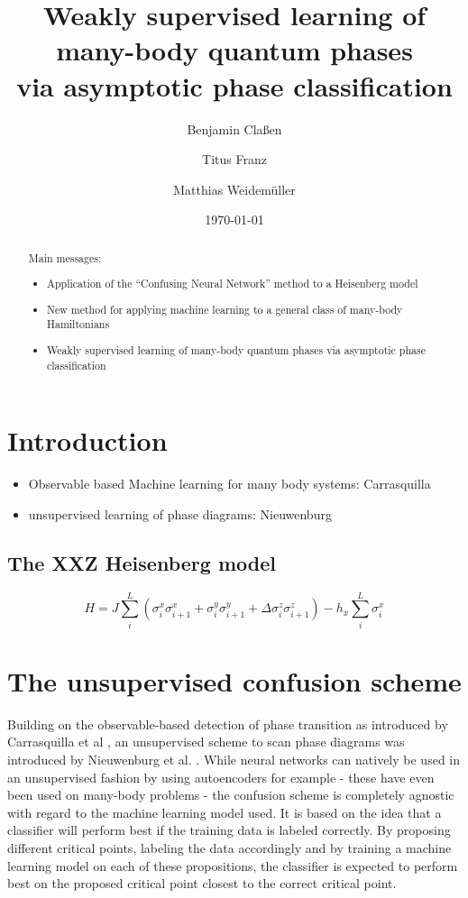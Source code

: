 \documentclass[prl, reprint, twocolumn]{revtex4-1}
\begin{document}
	\title{Weakly supervised learning of many-body quantum phases \\ via asymptotic phase classification}
	\date{\today}
	\author{Benjamin Claßen}
	\author{Titus Franz}
	\author{Matthias Weidemüller}
	\begin{abstract}
		
		Main messages:
		\begin{itemize}
			\item Application of the “Confusing Neural Network” method to a Heisenberg model
			\item New method for applying machine learning to a general class of many-body Hamiltonians
			\item Weakly supervised learning of many-body quantum phases via asymptotic phase classification
		\end{itemize}
		
	\end{abstract}
	\maketitle
	
	\section{Introduction}
	\begin{itemize}
		\item Observable based Machine learning for many body systems: Carrasquilla
		\item unsupervised learning of phase diagrams: Nieuwenburg
	\end{itemize}
	\blindtext[2]
	\subsection{The XXZ Heisenberg model}
	\begin{equation}
	H = J\sum_i^L\left(\sigma^x_i\sigma^x_{i+1}+\sigma^y_i\sigma^y_{i+1}+\Delta\sigma^z_i\sigma^z_{i+1}\right) - h_x\sum_i^L\sigma^x_i
	\label{eq:xxz}
	\end{equation}
	\blindtext[2]
	
	\section{The unsupervised confusion scheme}
	Building on the observable-based detection of phase transition as introduced by Carrasquilla et al \cite{Carrasquilla2017}, an unsupervised scheme to scan phase diagrams was introduced by Nieuwenburg et al. \cite{Nieuwenburg2017}.
	While neural networks can natively be used in an unsupervised fashion by using autoencoders for example - these have even been used on many-body problems \cite{Wetzel2017} - the confusion scheme is completely agnostic with regard to the machine learning model used. It is based on the idea that a classifier will perform best if the training data is labeled correctly. By proposing different critical points, labeling the data accordingly and by training a machine learning model on each of these propositions, the classifier is expected to perform best on the proposed critical point closest to the correct critical point.
	
\end{document}

